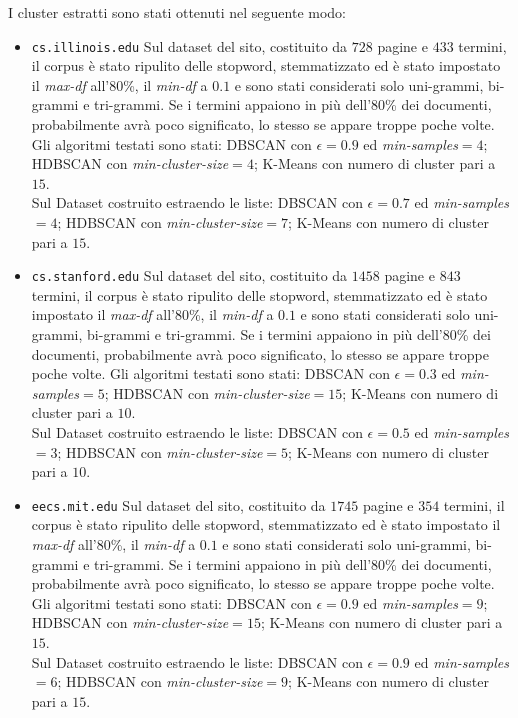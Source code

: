 I cluster estratti sono stati ottenuti nel seguente modo:
\begin{itemize}
\item \texttt{cs.illinois.edu}
Sul dataset del sito, costituito da $728$ pagine e $433$ termini, il corpus è stato ripulito delle stopword, stemmatizzato ed è stato impostato il \textit{max-df} all'80\%, il \textit{min-df} a $0.1$ e sono stati considerati solo uni-grammi, bi-grammi e tri-grammi. Se i termini appaiono in più dell'80\% dei documenti, probabilmente avrà poco significato, lo stesso se appare troppe poche volte. Gli algoritmi testati sono stati: DBSCAN con $\epsilon = 0.9$ ed \textit{min-samples}$ = 4$; HDBSCAN con \textit{min-cluster-size}$=4$; K-Means con numero di cluster pari a $15$. \\Sul Dataset costruito estraendo le liste: DBSCAN con $\epsilon = 0.7$ ed \textit{min-samples}$ = 4$; HDBSCAN con \textit{min-cluster-size}$=7$; K-Means con numero di cluster pari a $15$. 
\item \texttt{cs.stanford.edu}
Sul dataset del sito, costituito da $1458$ pagine e $843$ termini, il corpus è stato ripulito delle stopword, stemmatizzato ed è stato impostato il \textit{max-df} all'80\%, il \textit{min-df} a $0.1$ e sono stati considerati solo uni-grammi, bi-grammi e tri-grammi. Se i termini appaiono in più dell'80\% dei documenti, probabilmente avrà poco significato, lo stesso se appare troppe poche volte. Gli algoritmi testati sono stati: DBSCAN con $\epsilon = 0.3$ ed \textit{min-samples}$ = 5$; HDBSCAN con \textit{min-cluster-size}$=15$; K-Means con numero di cluster pari a $10$. \\Sul Dataset costruito estraendo le liste: DBSCAN con $\epsilon = 0.5$ ed \textit{min-samples}$ = 3$; HDBSCAN con \textit{min-cluster-size}$=5$; K-Means con numero di cluster pari a $10$. 
\item \texttt{eecs.mit.edu}
Sul dataset del sito, costituito da $1745$ pagine e $354$ termini, il corpus è stato ripulito delle stopword, stemmatizzato ed è stato impostato il \textit{max-df} all'80\%, il \textit{min-df} a $0.1$ e sono stati considerati solo uni-grammi, bi-grammi e tri-grammi. Se i termini appaiono in più dell'80\% dei documenti, probabilmente avrà poco significato, lo stesso se appare troppe poche volte. Gli algoritmi testati sono stati: DBSCAN con $\epsilon = 0.9$ ed \textit{min-samples}$ = 9$; HDBSCAN con \textit{min-cluster-size}$=15$; K-Means con numero di cluster pari a $15$. \\Sul Dataset costruito estraendo le liste: DBSCAN con $\epsilon = 0.9$ ed \textit{min-samples}$ = 6$; HDBSCAN con \textit{min-cluster-size}$=9$; K-Means con numero di cluster pari a $15$. 

\end{itemize}
